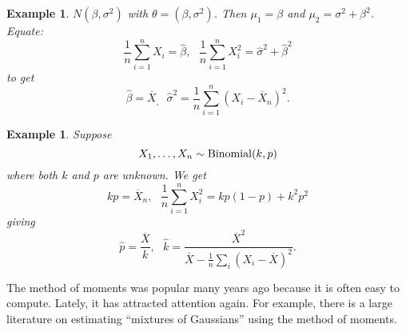 \documentclass[twoside,12pt]{article}
\newtheorem{example}[theorem]{Example}
\begin{document}
\vspace{1cm}

\begin{example}
$N(\beta,\sigma^2)$ with
$\theta = (\beta,\sigma^2)$.
Then
$\mu_1 = \beta$ and $\mu_2 = \sigma^2 + \beta^2$.
Equate:
$$
\frac{1}{n}\sum_{i=1}^n X_i = \widehat\beta,\ \ \ 
\frac{1}{n}\sum_{i=1}^n X_i^2 = \widehat\sigma^2 + \widehat\beta^2
$$
to get
$$
\widehat\beta = \overline{X}_,\ \ \ 
\widehat\sigma^2 = \frac{1}{n}\sum_{i=1}^n (X_i - \overline{X}_n)^2.
$$
\end{example}

\vspace{1cm}

\begin{example}
Suppose
$$
X_1, \ldots, X_n \sim {\rm Binomial}(k,p)
$$
where both $k$ and $p$ are unknown.
We get
$$
kp = \overline{X}_n,\ \ \ 
\frac{1}{n}\sum_{i=1}^n X_i^2 = kp (1-p) + k^2 p^2
$$
giving
$$
\widehat{p} = \frac{\overline{X}}{k},\ \ \ 
\widehat{k} = \frac{\overline{X}^2}{\overline{X}- \frac{1}{n}\sum_i (X_i-\overline{X})^2}.
$$
\end{example}


The method of moments was popular many years ago
because it is often easy to compute.
Lately, it has attracted attention again.
For example, there is a large literature on estimating
``mixtures of Gaussians'' using the method of moments.
\end{document}
